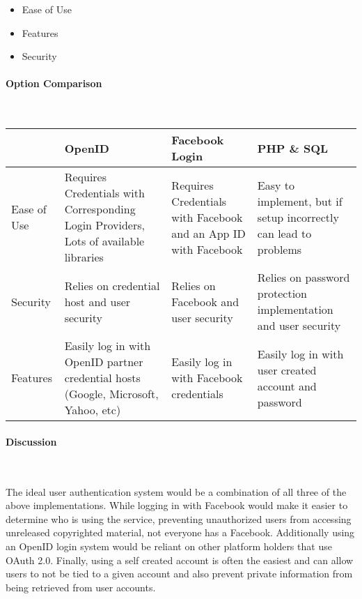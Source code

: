 \documentclass[letterpaper, 10pt, draftclsnofoot, compsoc, onecolumn]{IEEEtran}
\begin{document}
{{\begin{itemize}
\item Ease of Use
\item Features
\item Security

\end{itemize}

 \par}

\vspace{2pc}

\newpage
\paragraph{Option Comparison} ~\\
\vspace{1pc}
\tablehead{}
\begin{supertabular}{|p{2cm}|p{4cm}|p{4cm}|p{4cm}|}
\hline  
& OpenID 
& Facebook Login 
& PHP \& SQL\\ \hline
Ease of Use 
	& Requires Credentials with Corresponding Login Providers, Lots of available libraries  
	& Requires Credentials with Facebook and an App ID with Facebook 
	& Easy to implement, but if setup incorrectly can lead to problems\\ \hline
Security 
	& Relies on credential host and user security 
	& Relies on Facebook and user security 
	& Relies on password protection implementation and user security\\ \hline
Features 
	& Easily log in with OpenID partner credential hosts (Google, Microsoft, Yahoo, etc) 
	& Easily log in with Facebook credentials 
	& Easily log in with user created account and password \\ \hline

\end{supertabular}

\newpage
\paragraph{Discussion} ~\\
{\noindent The ideal user authentication system would be a combination of all three of the above implementations. While logging in with Facebook would make it easier to determine who is using the service, preventing unauthorized users from accessing unreleased copyrighted material, not everyone has a Facebook. Additionally using an OpenID login system would be reliant on other platform holders that use OAuth 2.0. Finally, using a self created account is often the easiest and can allow users to not be tied to a given account and also prevent private information from being retrieved from user accounts.\par}

}
\end{document}
